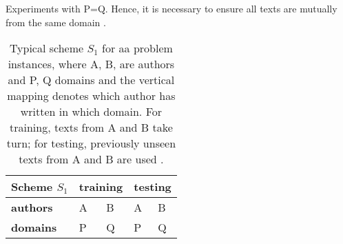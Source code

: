 \begin{definition}
    Experiments with P=Q.
    Hence, it is necessary to ensure all texts are mutually from the same domain \cite{bischoff_importance_2020}.
    \begin{table}[tbp]
        \centering
        \caption{Typical scheme $S_1$ for \ac{aa} problem instances, where A, B, are authors and P, Q domains and 
        the vertical mapping denotes which author has written in which domain. 
        For training, texts from A and B take turn; for testing, previously unseen texts from A and B are used \cite{bischoff_importance_2020}.}
        \label{tab:within_domain_aa}
        \begin{tabular}{|l|ll|ll|}
        \hline
        \textbf{Scheme $S_1$} & \multicolumn{2}{l|}{\textbf{training}} & \multicolumn{2}{l|}{\textbf{testing}} \\ \hline
        \textbf{authors} & \multicolumn{1}{l|}{A} & B & \multicolumn{1}{l|}{A} & B \\ \hline
        \textbf{domains} & \multicolumn{1}{l|}{P} & Q & \multicolumn{1}{l|}{P} & Q \\ \hline
        \end{tabular}%
    \end{table}
\end{definition}

